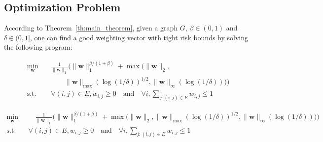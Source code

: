 \documentclass[letterpaper]{article} %
\def\DoubleColumn{}
\def\DoubleColumnEnd{}
\def\SingleColumn{}
\def\SingleColumnEnd{}
\newcommand{\weight}{\mathbf{w}}
\newcommand{\pair}[1]{(#1)}
\newcommand{\normo}[1]{\|#1\|_1}
\newcommand{\complexbound}{\beta}
\begin{document}
\subsection{Optimization Problem} %
\label{sub:optimization_problem}
According to Theorem~\ref{th:main_theorem}, given a graph $G$, $\complexbound\in (0,1)$ and $\delta\in(0,1]$, one can find a good weighting vector with tight risk bounds by solving the following program:
\DoubleColumn
\begin{equation}
    \label{eq:optimization_program}
\begin{aligned}
    \min_{\weight{}} \quad&\frac{1}{\normo{\weight{}}}\Bigg(\normo{\weight{}}^{\complexbound/(1+\complexbound)}+\max\Big(\|\weight{}\|_2,\\
    &\qquad\|\weight{}\|_{\max}(\log(1/\delta))^{1/2},
    \|\weight{}\|_\infty(\log(1/\delta))\Big)\Bigg)\\
    \mbox{s.t.} \quad& \forall \pair{i,j}\in E, w_{i,j}\ge 0 \quad \mbox{and} \quad  \forall i, \sum_{j:\pair{i,j}\in E} w_{i,j}\le 1
\end{aligned}
\end{equation}
\DoubleColumnEnd
\SingleColumn
\begin{equation}
    \label{eq:optimization_program}
\begin{aligned}
    \min_{\weight{}} & \quad\frac{1}{\normo{\weight{}}}\Bigg(\normo{\weight{}}^{\complexbound{}/(1+\complexbound{})}+\max\Big(\|\weight{}\|_2,\|\weight{}\|_{\max}(\log(1/\delta))^{1/2},\|\weight{}\|_\infty(\log(1/\delta))\Big)\Bigg)\\
    \mbox{s.t.} \quad& \forall \pair{i,j}\in E, w_{i,j}\ge 0 \quad \mbox{and} \quad  \forall i, \sum_{j:\pair{i,j}\in E} w_{i,j}\le 1
\end{aligned}
\end{equation}
\SingleColumnEnd
\end{document}
